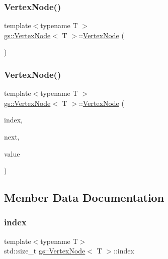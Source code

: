 \subsubsection{\texorpdfstring{Vertex\+Node()}{VertexNode()}\hspace{0.1cm}{\footnotesize\ttfamily [1/2]}}
{\footnotesize\ttfamily template$<$typename T $>$ \\
\mbox{\hyperlink{structgs_1_1_vertex_node}{gs\+::\+Vertex\+Node}}$<$ T $>$\+::\mbox{\hyperlink{structgs_1_1_vertex_node}{Vertex\+Node}} (\begin{DoxyParamCaption}{ }\end{DoxyParamCaption})}

\mbox{\label{structgs_1_1_vertex_node_a82bd37d0baf6474fb174a3bf5f9147ed}} 
\subsubsection{\texorpdfstring{Vertex\+Node()}{VertexNode()}\hspace{0.1cm}{\footnotesize\ttfamily [2/2]}}
{\footnotesize\ttfamily template$<$typename T $>$ \\
\mbox{\hyperlink{structgs_1_1_vertex_node}{gs\+::\+Vertex\+Node}}$<$ T $>$\+::\mbox{\hyperlink{structgs_1_1_vertex_node}{Vertex\+Node}} (\begin{DoxyParamCaption}\item[{std\+::size\+\_\+t}]{index,  }\item[{\mbox{\hyperlink{structgs_1_1_vertex_node}{Vertex\+Node}}$<$ T $>$ $\ast$}]{next,  }\item[{T}]{value }\end{DoxyParamCaption})}



\subsection{Member Data Documentation}
\mbox{\label{structgs_1_1_vertex_node_a8dd82fa9a0b37a0194368dcd7752b04a}} 
\subsubsection{\texorpdfstring{index}{index}}
{\footnotesize\ttfamily template$<$typename T$>$ \\
std\+::size\+\_\+t \mbox{\hyperlink{structgs_1_1_vertex_node}{gs\+::\+Vertex\+Node}}$<$ T $>$\+::index}

